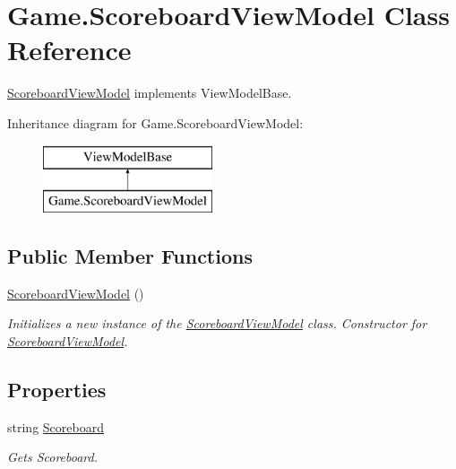 \hypertarget{class_game_1_1_scoreboard_view_model}{}\section{Game.\+Scoreboard\+View\+Model Class Reference}
\label{class_game_1_1_scoreboard_view_model}


\mbox{\hyperlink{class_game_1_1_scoreboard_view_model}{Scoreboard\+View\+Model}} implements View\+Model\+Base.  


Inheritance diagram for Game.\+Scoreboard\+View\+Model\+:\begin{figure}[H]
\begin{center}
\leavevmode
\includegraphics[height=2.000000cm]{class_game_1_1_scoreboard_view_model}
\end{center}
\end{figure}
\subsection*{Public Member Functions}
\begin{DoxyCompactItemize}
\item 
\mbox{\hyperlink{class_game_1_1_scoreboard_view_model_aa8aea0aaf34ff7463a96ed66d2e869c7}{Scoreboard\+View\+Model}} ()
\begin{DoxyCompactList}\small\item\em Initializes a new instance of the \mbox{\hyperlink{class_game_1_1_scoreboard_view_model}{Scoreboard\+View\+Model}} class. Constructor for \mbox{\hyperlink{class_game_1_1_scoreboard_view_model}{Scoreboard\+View\+Model}}. \end{DoxyCompactList}\end{DoxyCompactItemize}
\subsection*{Properties}
\begin{DoxyCompactItemize}
\item 
string \mbox{\hyperlink{class_game_1_1_scoreboard_view_model_ae97a07beed15f79ca932e61fa8485109}{Scoreboard}}
\begin{DoxyCompactList}\small\item\em Gets Scoreboard. \end{DoxyCompactList}\end{DoxyCompactItemize}


